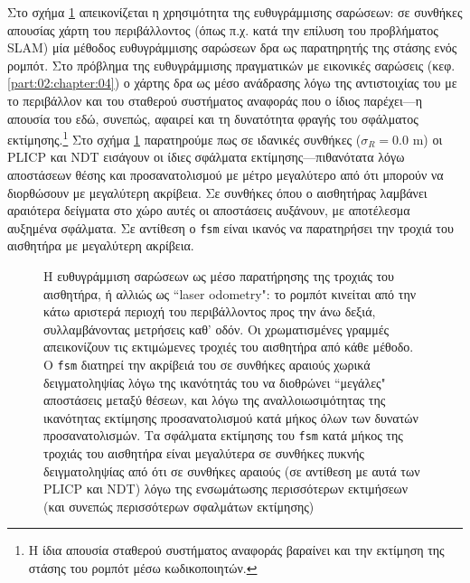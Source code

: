 Στο σχήμα \ref{fig:02_05_04:01} απεικονίζεται η χρησιμότητα της ευθυγράμμισης
σαρώσεων: σε συνθήκες απουσίας χάρτη του περιβάλλοντος (όπως π.χ. κατά την
επίλυση του προβλήματος SLAM) μία μέθοδος ευθυγράμμισης σαρώσεων δρα ως
παρατηρητής της στάσης ενός ρομπότ. Στο πρόβλημα της ευθυγράμμισης πραγματικών
με εικονικές σαρώσεις (κεφ. \ref{part:02:chapter:04}) ο χάρτης δρα ως μέσο
ανάδρασης λόγω της αντιστοιχίας του με το περιβάλλον και του σταθερού
συστήματος αναφοράς που ο ίδιος παρέχει---η απουσία του εδώ, συνεπώς, αφαιρεί
και τη δυνατότητα φραγής του σφάλματος εκτίμησης.\footnote{Η ίδια απουσία
σταθερού συστήματος αναφοράς βαραίνει και την εκτίμηση της στάσης του ρομπότ
μέσω κωδικοποιητών.} Στο σχήμα \ref{fig:02_05_04:01} παρατηρούμε πως σε
ιδανικές συνθήκες ($\sigma_R = 0.0$ m) οι PLICP και NDT εισάγουν οι ίδιες
σφάλματα εκτίμησης---πιθανότατα λόγω αποστάσεων θέσης και προσανατολισμού με
μέτρο μεγαλύτερο από ότι μπορούν να διορθώσουν με μεγαλύτερη ακρίβεια. Σε
συνθήκες όπου ο αισθητήρας λαμβάνει αραιότερα δείγματα στο χώρο αυτές οι
αποστάσεις αυξάνουν, με αποτέλεσμα αυξημένα σφάλματα. Σε αντίθεση ο
\texttt{fsm} είναι ικανός να παρατηρήσει την τροχιά του αισθητήρα με μεγαλύτερη
ακρίβεια.

\begin{figure}[]\centering
  
  \vspace{-2cm}
  \caption{\small Η ευθυγράμμιση σαρώσεων ως μέσο παρατήρησης της τροχιάς του
           αισθητήρα, ή αλλιώς ως ``laser odometry": το ρομπότ κινείται από
           την κάτω αριστερά περιοχή του περιβάλλοντος προς την άνω δεξιά,
           συλλαμβάνοντας μετρήσεις καθ' οδόν. Οι χρωματισμένες γραμμές
           απεικονίζουν τις εκτιμώμενες τροχιές του αισθητήρα από κάθε μέθοδο.
           Ο \texttt{fsm} διατηρεί την ακρίβειά του σε συνθήκες αραιούς χωρικά
           δειγματοληψίας λόγω της ικανότητάς του να διοθρώνει ``μεγάλες"
           αποστάσεις μεταξύ θέσεων, και λόγω της αναλλοιωσιμότητας της
           ικανότητας εκτίμησης προσανατολισμού κατά μήκος όλων των δυνατών
           προσανατολισμών. Τα σφάλματα εκτίμησης του \texttt{fsm} κατά μήκος
           της τροχιάς του αισθητήρα είναι μεγαλύτερα σε συνθήκες πυκνής
           δειγματοληψίας από ότι σε συνθήκες αραιούς (σε αντίθεση με αυτά των
           PLICP και NDT) λόγω της ενσωμάτωσης περισσότερων εκτιμήσεων (και
           συνεπώς περισσότερων σφαλμάτων εκτίμησης)}
  \label{fig:02_05_04:01}
\end{figure}


